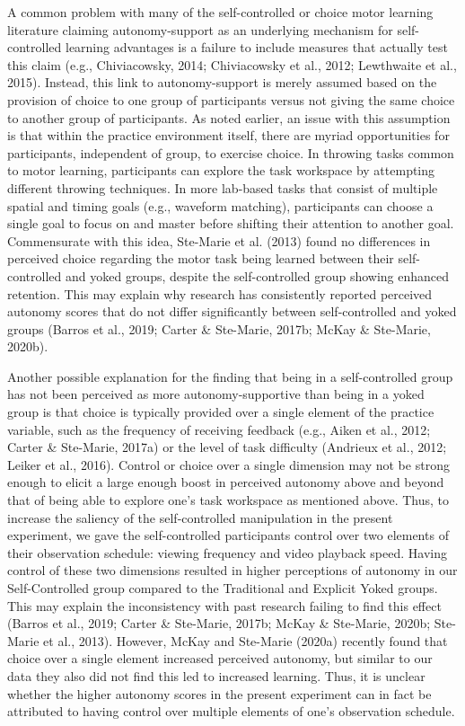 \documentclass[
  english,
  jou]{apa7}
\begin{document}
A common problem with many of the self-controlled or choice motor learning literature claiming autonomy-support as an underlying mechanism for self-controlled learning advantages is a failure to include measures that actually test this claim (e.g., Chiviacowsky, 2014; Chiviacowsky et al., 2012; Lewthwaite et al., 2015). Instead, this link to autonomy-support is merely assumed based on the provision of choice to one group of participants versus not giving the same choice to another group of participants. As noted earlier, an issue with this assumption is that within the practice environment itself, there are myriad opportunities for participants, independent of group, to exercise choice. In throwing tasks common to motor learning, participants can explore the task workspace by attempting different throwing techniques. In more lab-based tasks that consist of multiple spatial and timing goals (e.g., waveform matching), participants can choose a single goal to focus on and master before shifting their attention to another goal. Commensurate with this idea, Ste-Marie et al. (2013) found no differences in perceived choice regarding the motor task being learned between their self-controlled and yoked groups, despite the self-controlled group showing enhanced retention. This may explain why research has consistently reported perceived autonomy scores that do not differ significantly between self-controlled and yoked groups (Barros et al., 2019; Carter \& Ste-Marie, 2017b; McKay \& Ste-Marie, 2020b).

Another possible explanation for the finding that being in a self-controlled group has not been perceived as more autonomy-supportive than being in a yoked group is that choice is typically provided over a single element of the practice variable, such as the frequency of receiving feedback (e.g., Aiken et al., 2012; Carter \& Ste-Marie, 2017a) or the level of task difficulty (Andrieux et al., 2012; Leiker et al., 2016). Control or choice over a single dimension may not be strong enough to elicit a large enough boost in perceived autonomy above and beyond that of being able to explore one's task workspace as mentioned above. Thus, to increase the saliency of the self-controlled manipulation in the present experiment, we gave the self-controlled participants control over two elements of their observation schedule: viewing frequency and video playback speed. Having control of these two dimensions resulted in higher perceptions of autonomy in our Self-Controlled group compared to the Traditional and Explicit Yoked groups. This may explain the inconsistency with past research failing to find this effect (Barros et al., 2019; Carter \& Ste-Marie, 2017b; McKay \& Ste-Marie, 2020b; Ste-Marie et al., 2013). However, McKay and Ste-Marie (2020a) recently found that choice over a single element increased perceived autonomy, but similar to our data they also did not find this led to increased learning. Thus, it is unclear whether the higher autonomy scores in the present experiment can in fact be attributed to having control over multiple elements of one's observation schedule.
\end{document}
